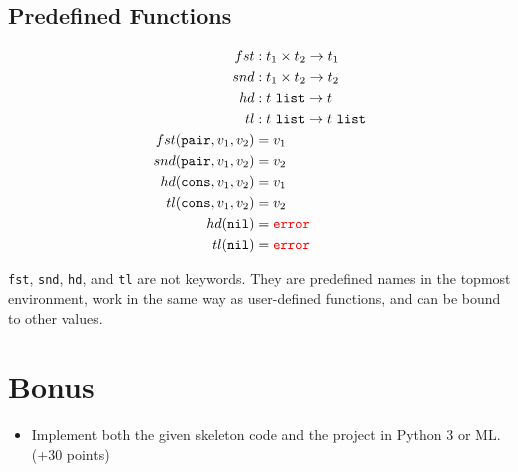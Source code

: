 \documentclass{article}
\begin{document}
\subsection{Predefined Functions}

\begin{align*}
  fst &: t_1\times t_2\to t_1 \\
  snd &: t_1\times t_2\to t_2 \\
  hd &: t\ \texttt{list}\to t \\
  tl &: t\ \texttt{list}\to t\ \texttt{list} \\
  fst(\texttt{pair},v_1,v_2) &= v_1 \\
  snd(\texttt{pair},v_1,v_2) &= v_2 \\
  hd(\texttt{cons},v_1,v_2) &= v_1 \\
  tl(\texttt{cons},v_1,v_2) &= v_2 \\
  hd(\texttt{nil}) &= \textcolor{red}{\tt error} \\
  tl(\texttt{nil}) &= \textcolor{red}{\tt error}
\end{align*}

\texttt{fst}, \texttt{snd}, \texttt{hd}, and \texttt{tl} are not keywords.
They are predefined names in the topmost environment, work in the same way as user-defined functions, and can be bound to other values.

\section{Bonus}

\begin{itemize}
  \item Implement both the given skeleton code and the project in Python 3 or ML. (+30 points)
\end{itemize}
\end{document}
